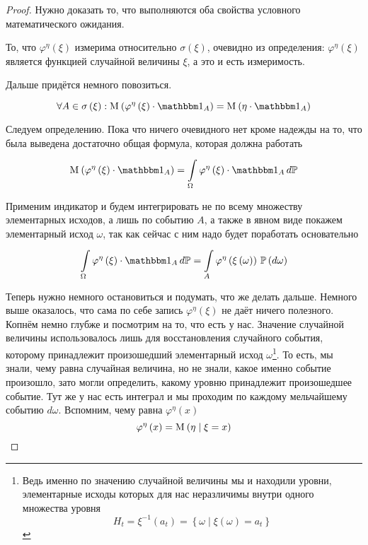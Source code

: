 \begin{proof}
Нужно доказать то, что выполняются оба свойства
условного математического ожидания.

То, что $\varphi^{\eta}\left( \xi \right)$ измерима
относительно $\sigma\left( \xi \right)$,
очевидно из определения: $\varphi^{\eta}\left( \xi \right)$ является функцией
случайной величины $\xi$, а это и есть измеримость.

Дальше придётся немного повозиться.

$$\forall A \in \sigma\left( \xi \right):
    \mean{\left( \varphi^{\eta}\left( \xi \right) \cdot \indicatorof{A} \right)}
        =\mean{\left( \eta \cdot \indicatorof{A} \right)}$$

Следуем определению. Пока что ничего очевидного нет кроме надежды на то,
что была выведена достаточно общая формула, которая должна работать
$$\mean{\left( \varphi^{\eta}\left( \xi \right) \cdot \indicatorof{A} \right)}
    = \integrall{\Omega}{d\mathbb{P}}{
    \varphi^{\eta}\left( \xi \right) \cdot \indicatorof{A}}$$

Применим индикатор и будем интегрировать
не по всему множеству элементарных исходов, а лишь по событию $A$,
а также в явном виде покажем элементарный исход $\omega$,
так как сейчас с ним надо будет поработать основательно
\begin{equation}\label{conditionalExpectationIntegralStart}
    \integrall{\Omega}{d\mathbb{P}}{
        \varphi^{\eta}\left( \xi \right) \cdot \indicatorof{A}}
    = \integrall{A}{\probability{d\omega}}{
        \varphi^{\eta}\left( \xi\left( \omega \right) \right)}
\end{equation}

Теперь нужно немного остановиться и подумать, что же делать дальше.
Немного выше оказалось, что сама по себе запись $\varphi^{\eta}\left( \xi \right)$
не даёт ничего полезного.
Копнём немно глубже и посмотрим на то, что есть у нас.
Значение случайной величины использовалось лишь
для восстановления случайного события,
которому принадлежит произошедший элементарный исход $\omega$\footnote{Ведь
именно по значению случайной величины мы и находили уровни, элементарные исходы
которых для нас неразличимы внутри одного множества уровня
$$H_t = \xi^{-1}\left( a_t \right)
    = \left\{ \omega \mid \xi\left( \omega \right) = a_t \right\}$$}.
То есть, мы знали, чему равна случайная величина,
но не знали, какое именно событие произошло,
зато могли определить, какому уровню принадлежит произошедшее событие.
Тут же у нас есть интеграл
и мы проходим по каждому мельчайшему событию $d\omega$.
Вспомним, чему равна $\varphi^{\eta}\left( x \right)$
$$\varphi^{\eta}\left( x \right) = \mathrm{M}_{} \left( \eta \mid \xi = x \right)$$


\end{proof}
